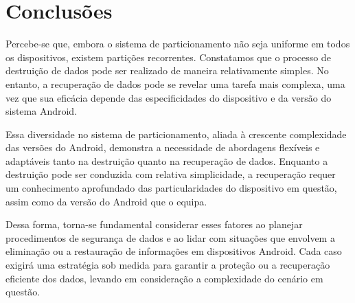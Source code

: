 \section{Conclusões}

Percebe-se que, embora o sistema de particionamento não seja uniforme em todos os dispositivos, existem partições recorrentes. Constatamos que o processo de destruição de dados pode ser realizado de maneira relativamente simples. No entanto, a recuperação de dados pode se revelar uma tarefa mais complexa, uma vez que sua eficácia depende das especificidades do dispositivo e da versão do sistema Android.

Essa diversidade no sistema de particionamento, aliada à crescente complexidade das versões do Android, demonstra a necessidade de abordagens flexíveis e adaptáveis tanto na destruição quanto na recuperação de dados. Enquanto a destruição pode ser conduzida com relativa simplicidade, a recuperação requer um conhecimento aprofundado das particularidades do dispositivo em questão, assim como da versão do Android que o equipa.

Dessa forma, torna-se fundamental considerar esses fatores ao planejar procedimentos de segurança de dados e ao lidar com situações que envolvem a eliminação ou a restauração de informações em dispositivos Android. Cada caso exigirá uma estratégia sob medida para garantir a proteção ou a recuperação eficiente dos dados, levando em consideração a complexidade do cenário em questão.